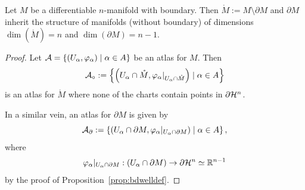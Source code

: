 \begin{proposition}
  Let $M$ be a differentiable $n$-manifold with boundary.
  Then $\mathring M := M\setminus\partial M$ and $\partial M$ inherit the structure of manifolds (without boundary) of dimensions $\dim(\mathring M)=n$ and $\dim(\partial M) = n-1$.
\end{proposition}
\begin{proof}
  Let $\mathcal{A} = \{(U_\alpha,\varphi_\alpha) \mid \alpha\in A\}$ be an atlas for $M$.
  Then
  \begin{equation}
    \mathcal{A}_\circ := \left\{
    \left(
    U_\alpha \cap \mathring M,
    \varphi_\alpha|_{U_\alpha \cap \mathring M}
    \right) \mid \alpha\in A
    \right\}
  \end{equation}
  is an atlas for $\mathring M$ where none of the charts contain points in $\partial\mathcal{H}^n$.

  In a similar vein, an atlas for $\partial M$ is given by
  \begin{equation}
    \mathcal{A}_\partial := \left\{
    \left(
    U_\alpha \cap \partial M,
    \varphi_\alpha|_{U_\alpha \cap \partial M}
    \right) \mid \alpha\in A
    \right\},
  \end{equation}
  where
  \begin{equation}
    \varphi_\alpha|_{U_\alpha \cap \partial M} : (U_\alpha \cap \partial M) \to \partial\mathcal{H}^n\simeq\mathbb{R}^{n-1}
  \end{equation}
  by the proof of Proposition~\ref{prop:bdwelldef}.
\end{proof}

